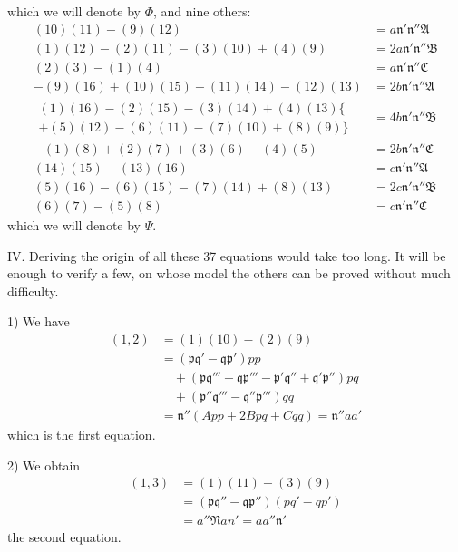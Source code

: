 which we will denote by $\Phi$, and nine others:
\[
\begin{aligned}
(10)(11)-(9)(12)&=a\mathfrak{n}'\mathfrak{n}''\mathfrak{A}\\
(1)(12)-(2)(11)-(3)(10)+(4)(9)&=2a\mathfrak{n}'\mathfrak{n}''\mathfrak{B}\\
(2)(3)-(1)(4)&=a\mathfrak{n}'\mathfrak{n}''\mathfrak{C}\\
-(9)(16)+(10)(15)+(11)(14)-(12)(13)&=2b\mathfrak{n}'\mathfrak{n}''\mathfrak{A}\\
\begin{gathered}
(1)(16)-(2)(15)-(3)(14)+(4)(13)\{\\
+(5)(12)-(6)(11)-(7)(10)+(8)(9)\}
\end{gathered}&=4b\mathfrak{n}'\mathfrak{n}''\mathfrak{B}\\
-(1)(8)+(2)(7)+(3)(6)-(4)(5)&=2b\mathfrak{n}'\mathfrak{n}''\mathfrak{C}\\
(14)(15)-(13)(16)&=c\mathfrak{n}'\mathfrak{n}''\mathfrak{A}\\
(5)(16)-(6)(15)-(7)(14)+(8)(13)&=2c\mathfrak{n}'\mathfrak{n}''\mathfrak{B}\\
(6)(7)-(5)(8)&=c\mathfrak{n}'\mathfrak{n}''\mathfrak{C}
\end{aligned}
\]
which we will denote by $\Psi$.

IV. Deriving the origin of all these 37 equations would take too long. It will be enough to verify a few, on whose model the others can be proved without much difficulty.

\leavevmode{}
1) We have
\[
\begin{aligned}
(1,2)&=(1)(10)-(2)(9)\\
&=(\mathfrak{p}\mathfrak{q}'-\mathfrak{q}\mathfrak{p}')pp\\&\quad+(\mathfrak{p}\mathfrak{q}'''-\mathfrak{q}\mathfrak{p}'''-\mathfrak{p}'\mathfrak{q}''+\mathfrak{q}'\mathfrak{p}'')pq\\&\quad+(\mathfrak{p}''\mathfrak{q}'''-\mathfrak{q}''\mathfrak{p}''')qq\\
&=\mathfrak{n}''(App+2Bpq+Cqq)=\mathfrak{n}''aa'
\end{aligned}
\]
which is the first equation.

2) We obtain
\[
\begin{aligned}(1,3)&=(1)(11)-(3)(9)\\&=(\mathfrak{p}\mathfrak{q}''-\mathfrak{q}\mathfrak{p}'')(pq'-qp')\\&=a''\mathfrak{N}an'=aa''\mathfrak{n}'\end{aligned}
\]
the second equation.

